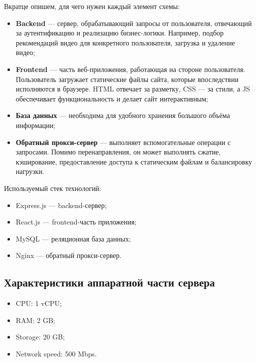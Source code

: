 \documentclass[12pt]{article}
\begin{document}
Вкратце опишем, для чего нужен каждый элемент схемы:

\begin{itemize}
    \item \textbf{Backend} — сервер, обрабатывающий запросы от пользователя, отвечающий за аутентификацию и реализацию бизнес-логики.
          Например, подбор рекомендаций видео для конкретного пользователя, загрузка и удаление видео;

    \item \textbf{Frontend} — часть веб-приложения, работающая на стороне пользователя.
          Пользователь загружает статические файлы сайта, которые впоследствии исполняются в браузере.
          HTML отвечает за разметку, CSS — за стили, а JS обеспечивает функциональность и делает сайт интерактивным;

    \item \textbf{База данных} — необходима для удобного хранения большого объёма информации;

    \item \textbf{Обратный прокси-сервер} — выполняет вспомогательные операции с запросами.
          Помимо перенаправления, он может выполнять сжатие, кэширование, предоставление доступа к статическим файлам и балансировку нагрузки.
\end{itemize}

Используемый стек технологий:

\begin{itemize}
    \item Express.js — backend-сервер;
    \item React.js — frontend-часть приложения;
    \item MySQL — реляционная база данных;
    \item Nginx — обратный прокси-сервер.
\end{itemize}

\subsection{Характеристики аппаратной части сервера}

\begin{itemize}
    \item CPU: 1 vCPU;
    \item RAM: 2 GB;
    \item Storage: 20 GB;
    \item Network speed: 500 Mbps.
\end{itemize}
\end{document}
